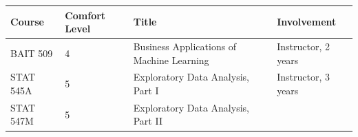 \documentclass[]{article}
\begin{document}
\begin{longtable}[]{@{}llll@{}}
\toprule
\begin{minipage}[b]{0.21\columnwidth}\raggedright
Course\strut
\end{minipage} & \begin{minipage}[b]{0.29\columnwidth}\raggedright
Comfort Level\strut
\end{minipage} & \begin{minipage}[b]{0.13\columnwidth}\raggedright
Title\strut
\end{minipage} & \begin{minipage}[b]{0.25\columnwidth}\raggedright
Involvement\strut
\end{minipage}\tabularnewline
\midrule
\endhead
\begin{minipage}[t]{0.21\columnwidth}\raggedright
BAIT 509\strut
\end{minipage} & \begin{minipage}[t]{0.29\columnwidth}\raggedright
4\strut
\end{minipage} & \begin{minipage}[t]{0.13\columnwidth}\raggedright
Business Applications of Machine Learning\strut
\end{minipage} & \begin{minipage}[t]{0.25\columnwidth}\raggedright
Instructor, 2 years\strut
\end{minipage}\tabularnewline
\begin{minipage}[t]{0.21\columnwidth}\raggedright
STAT 545A\strut
\end{minipage} & \begin{minipage}[t]{0.29\columnwidth}\raggedright
5\strut
\end{minipage} & \begin{minipage}[t]{0.13\columnwidth}\raggedright
Exploratory Data Analysis, Part I\strut
\end{minipage} & \begin{minipage}[t]{0.25\columnwidth}\raggedright
Instructor, 3 years\strut
\end{minipage}\tabularnewline
\begin{minipage}[t]{0.21\columnwidth}\raggedright
STAT 547M\strut
\end{minipage} & \begin{minipage}[t]{0.29\columnwidth}\raggedright
5\strut
\end{minipage} & \begin{minipage}[t]{0.13\columnwidth}\raggedright
Exploratory Data Analysis, Part II\strut

\end{minipage}
\end{longtable}
\end{document}
